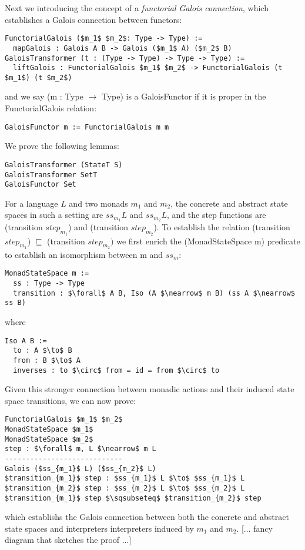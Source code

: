 \documentclass{article}
\begin{document}
Next we introducing the concept of a \textit{functorial Galois connection},
which establishes a Galois connection between functors:
\begin{lstlisting}[mathescape]
FunctorialGalois ($m_1$ $m_2$: Type -> Type) :=
  mapGalois : Galois A B -> Galois ($m_1$ A) ($m_2$ B)
GaloisTransformer (t : (Type -> Type) -> Type -> Type) :=
  liftGalois : FunctorialGalois $m_1$ $m_2$ -> FunctorialGalois (t $m_1$) (t $m_2$)
\end{lstlisting}
and we say (m : Type $\to$ Type) is a GaloisFunctor if it is proper in the
FunctorialGalois relation:
\begin{lstlisting}[mathescape]
GaloisFunctor m := FunctorialGalois m m
\end{lstlisting}

We prove the following lemmas:
\begin{lstlisting}[mathescape]
GaloisTransformer (StateT S)
GaloisTransformer SetT
GaloisFunctor Set
\end{lstlisting}

For a language $L$ and two monads $m_1$ and $m_2$, the concrete and abstract
state spaces in such a setting are $ss_{m_1} L$ and $ss_{m_2} L$, and the step
functions are (transition $step_{m_1}$) and (transition $step_{m_2}$). To
establish the relation (transition $step_{m_1}$) $\sqsubseteq$ (transition
$step_{m_2})$ we first enrich the (MonadStateSpace m) predicate to establish
an isomorphism between m and $ss_m$:
\begin{lstlisting}[mathescape]
MonadStateSpace m :=
  ss : Type -> Type
  transition : $\forall$ A B, Iso (A $\nearrow$ m B) (ss A $\nearrow$ ss B)
\end{lstlisting}
where
\begin{lstlisting}[mathescape]
Iso A B :=
  to : A $\to$ B
  from : B $\to$ A
  inverses : to $\circ$ from = id = from $\circ$ to
\end{lstlisting}

Given this stronger connection between monadic actions and their induced
state space transitions, we can now prove:
\begin{lstlisting}[mathescape]
FunctorialGalois $m_1$ $m_2$
MonadStateSpace $m_1$
MonadStateSpace $m_2$
step : $\forall$ m, L $\nearrow$ m L
----------------------------
Galois ($ss_{m_1}$ L) ($ss_{m_2}$ L)
$transition_{m_1}$ step : $ss_{m_1}$ L $\to$ $ss_{m_1}$ L
$transition_{m_2}$ step : $ss_{m_2}$ L $\to$ $ss_{m_2}$ L
$transition_{m_1}$ step $\sqsubseteq$ $transition_{m_2}$ step
\end{lstlisting}
which establishs the Galois connection between both the concrete and abstract
state spaces and interpreters interpreters induced by $m_1$ and $m_2$.
%
[... fancy diagram that sketches the proof ...]
\end{document}
